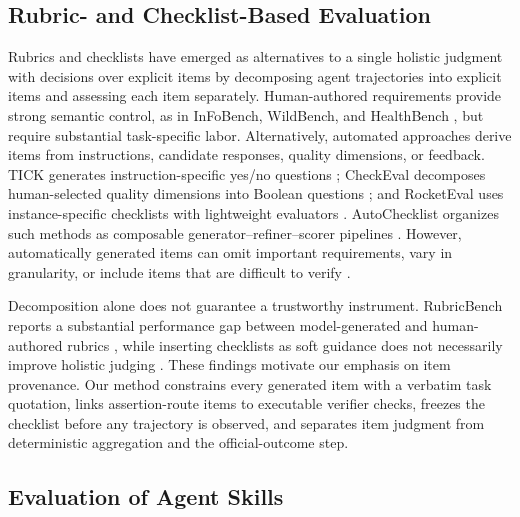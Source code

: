 \documentclass[sigconf,nonacm]{acmart}
\begin{document}
\subsection{Rubric- and Checklist-Based Evaluation}
\label{sec:rw-checklists}

Rubrics and checklists have emerged as alternatives to a single holistic judgment with decisions over explicit items by decomposing agent trajectories into explicit items and assessing each item separately. Human-authored requirements provide strong semantic control, as in InFoBench, WildBench, and HealthBench
\citep{qin2024infobench,lin2024wildbench,healthbench2025}, but require
substantial task-specific labor. Alternatively, automated approaches derive items
from instructions, candidate responses, quality dimensions, or feedback.
TICK generates instruction-specific yes/no questions
\citep{cook2024tick}; CheckEval decomposes human-selected quality dimensions
into Boolean questions \citep{lee2025checkeval}; and RocketEval uses
instance-specific checklists with lightweight evaluators
\citep{wei2025rocketeval}. AutoChecklist organizes such methods as composable
generator--refiner--scorer pipelines \citep{zhou2026autochecklist}. However, automatically generated items can omit important requirements, vary in granularity, or include items that are difficult to verify
\citep{song2024finesure,saadfalcon2025unittests,que2024hellobench,interacteval2024,dineen2025qalign}.

Decomposition alone does not guarantee a trustworthy instrument. RubricBench
reports a substantial performance gap between model-generated and
human-authored rubrics \citep{zhang2026rubricbench}, while inserting checklists
as soft guidance does not necessarily improve holistic judging
\citep{furuhashi2025checklists,ding2026adarubric,liu2026openrubrics,rlcf2025,wan2026rubricguided}. These findings motivate our emphasis on
item provenance. Our method constrains every generated item with a
verbatim task quotation, links assertion-route items to executable verifier
checks, freezes the checklist before any trajectory is observed, and separates
item judgment from deterministic aggregation and the official-outcome step.


\subsection{Evaluation of Agent Skills}
\label{sec:rw-skills}
\end{document}
